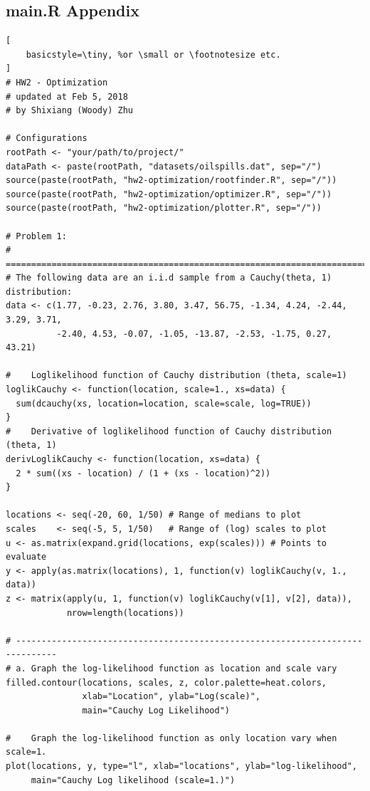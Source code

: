 \begin{appendices}
\section{main.R Appendix}
\label{appendix:main}
\begin{lstlisting}[
	basicstyle=\tiny, %or \small or \footnotesize etc.
]
# HW2 - Optimization
# updated at Feb 5, 2018
# by Shixiang (Woody) Zhu

# Configurations
rootPath <- "your/path/to/project/"
dataPath <- paste(rootPath, "datasets/oilspills.dat", sep="/")
source(paste(rootPath, "hw2-optimization/rootfinder.R", sep="/"))
source(paste(rootPath, "hw2-optimization/optimizer.R", sep="/"))
source(paste(rootPath, "hw2-optimization/plotter.R", sep="/"))

# Problem 1:
# ==============================================================================
# The following data are an i.i.d sample from a Cauchy(theta, 1) distribution: 
data <- c(1.77, -0.23, 2.76, 3.80, 3.47, 56.75, -1.34, 4.24, -2.44, 3.29, 3.71, 
          -2.40, 4.53, -0.07, -1.05, -13.87, -2.53, -1.75, 0.27, 43.21)

#    Loglikelihood function of Cauchy distribution (theta, scale=1)
loglikCauchy <- function(location, scale=1., xs=data) {
  sum(dcauchy(xs, location=location, scale=scale, log=TRUE))
}
#    Derivative of loglikelihood function of Cauchy distribution (theta, 1)
derivLoglikCauchy <- function(location, xs=data) { 
  2 * sum((xs - location) / (1 + (xs - location)^2))
}

locations <- seq(-20, 60, 1/50) # Range of medians to plot
scales    <- seq(-5, 5, 1/50)   # Range of (log) scales to plot
u <- as.matrix(expand.grid(locations, exp(scales))) # Points to evaluate
y <- apply(as.matrix(locations), 1, function(v) loglikCauchy(v, 1., data))
z <- matrix(apply(u, 1, function(v) loglikCauchy(v[1], v[2], data)),
            nrow=length(locations))

# ------------------------------------------------------------------------------
# a. Graph the log-likelihood function as location and scale vary
filled.contour(locations, scales, z, color.palette=heat.colors,
               xlab="Location", ylab="Log(scale)",
               main="Cauchy Log Likelihood")

#    Graph the log-likelihood function as only location vary when scale=1.
plot(locations, y, type="l", xlab="locations", ylab="log-likelihood", 
     main="Cauchy Log likelihood (scale=1.)")


\end{lstlisting}
\end{appendices}
